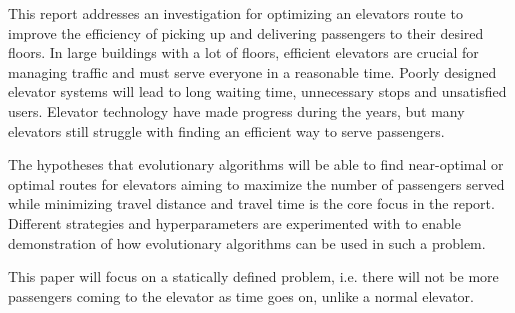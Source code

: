 
This report addresses an investigation for optimizing an elevators route to improve the efficiency of picking up and delivering passengers to their desired floors.
In large buildings with a lot of floors, efficient elevators are crucial for managing traffic and must serve everyone in a reasonable time.
Poorly designed elevator systems will lead to long waiting time, unnecessary stops and unsatisfied users.
Elevator technology have made progress during the years, but many elevators still struggle with finding an efficient way
to serve passengers.

The hypotheses that evolutionary algorithms will be able to find near-optimal or optimal routes for elevators
aiming to maximize the number of passengers served while minimizing travel distance and travel time is
the core focus in the report. Different strategies and hyperparameters are experimented with to enable
demonstration of how evolutionary algorithms can be used in such a problem.

This paper will focus on a statically defined problem, i.e. there will not be more passengers coming to the elevator as time goes on, unlike a normal elevator.
